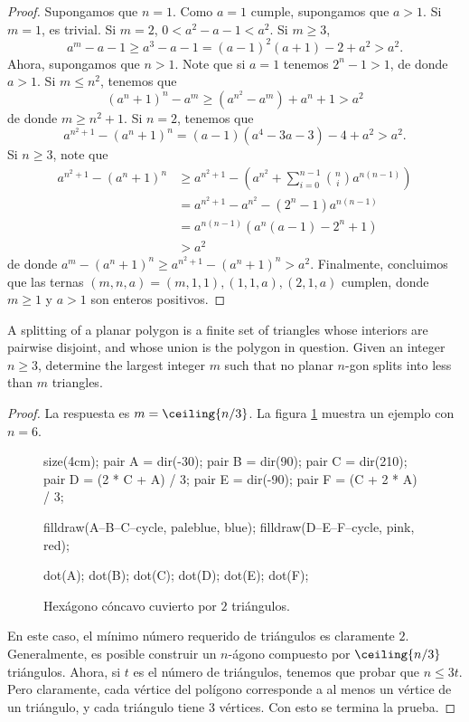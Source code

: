 \begin{proof}
	Supongamos que $n=1$. Como $a=1$ cumple, supongamos que $a>1$. Si $m=1$, es trivial. Si $m=2$, $0<a^2-a-1<a^2$. Si $m\ge 3$,
	\[a^m-a-1\ge a^3-a-1=(a-1)^2(a+1)-2+a^2>a^2.\]
	Ahora, supongamos que $n>1$. Note que si $a=1$ tenemos $2^n-1>1$, de donde $a>1$. Si $m\le n^2$, tenemos que
	\[(a^n+1)^n-a^m\ge \left(a^{n^2}-a^m\right)+a^n+1>a^2\]
	de donde $m\ge n^2+1$. Si $n=2$, tenemos que
	\[a^{n^2+1}-(a^n+1)^n=(a-1)(a^4-3a-3)-4+a^2>a^2.\]
	Si $n\ge 3$, note que
	\begin{align*}
		a^{n^2+1}-(a^n+1)^n
		&\ge a^{n^2+1}-\left(a^{n^2}+\sum_{i=0}^{n-1}\binom{n}{i}a^{n(n-1)}\right) \\
		&=a^{n^2+1}-a^{n^2}-(2^n-1)a^{n(n-1)} \\
		&=a^{n(n-1)}\left(a^n(a-1)-2^n+1\right) \\
		&>a^2
	\end{align*}
	de donde $a^m-(a^n+1)^n\ge a^{n^2+1}-(a^n+1)^n>a^2$. Finalmente, concluimos que las ternas $(m,n,a)=(m,1,1),(1,1,a),(2,1,a)$ cumplen, donde $m\ge 1$ y $a>1$ son enteros positivos.
\end{proof}

\begin{probEG}
	A splitting of a planar polygon is a finite set of triangles whose interiors are pairwise disjoint, and whose union is the polygon in question. Given an integer $n\ge 3$, determine the largest integer $m$ such that no planar $n$-gon splits into less than $m$ triangles.
\end{probEG}

\begin{proof}
	La respuesta es $m=\ceiling{n/3}$. La figura \ref{fig:splitting_hexagon} muestra un ejemplo con $n=6$.

	\begin{figure}[ht!]
		\centering
		\begin{asy}
			size(4cm);
			pair A = dir(-30);
			pair B = dir(90);
			pair C = dir(210);
			pair D = (2 * C + A) / 3;
			pair E = dir(-90);
			pair F = (C + 2 * A) / 3;

			filldraw(A--B--C--cycle, paleblue, blue);
			filldraw(D--E--F--cycle, pink, red);

			dot(A);
			dot(B);
			dot(C);
			dot(D);
			dot(E);
			dot(F);
		\end{asy}
		\caption{Hexágono cóncavo cuvierto por $2$ triángulos.}
		\label{fig:splitting_hexagon}
	\end{figure}

	En este caso, el mínimo número requerido de triángulos es claramente $2$. Generalmente, es posible construir un $n$-ágono compuesto por $\ceiling{n/3}$ triángulos. Ahora, si $t$ es el número de triángulos, tenemos que probar que $n\le 3t$. Pero claramente, cada vértice del polígono corresponde a al menos un vértice de un triángulo, y cada triángulo tiene $3$ vértices. Con esto se termina la prueba.
\end{proof}

